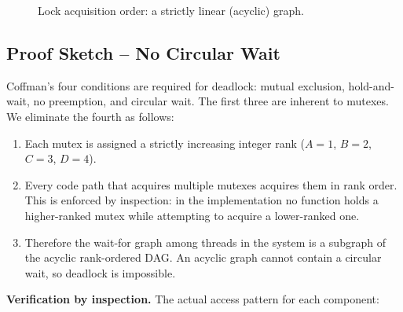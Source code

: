 \documentclass[11pt,a4paper]{article}
\begin{document}
\begin{figure}[H]
\centering
{}
\caption{Lock acquisition order: a strictly linear (acyclic) graph.}
\end{figure}

\subsection{Proof Sketch -- No Circular Wait}

Coffman's four conditions are required for deadlock: mutual exclusion,
hold-and-wait, no preemption, and circular wait. The first three are
inherent to mutexes. We eliminate the fourth as follows:

\begin{enumerate}
    \item Each mutex is assigned a strictly increasing integer rank
        ($A=1$, $B=2$, $C=3$, $D=4$).
    \item Every code path that acquires multiple mutexes acquires them in
        rank order. This is enforced by inspection: in the
        implementation no function holds a higher-ranked mutex while
        attempting to acquire a lower-ranked one.
    \item Therefore the wait-for graph among threads in the system is a
        subgraph of the acyclic rank-ordered DAG. An acyclic graph cannot
        contain a circular wait, so deadlock is impossible.
\end{enumerate}

\noindent
\textbf{Verification by inspection.} The actual access pattern for each
component:
\end{document}
